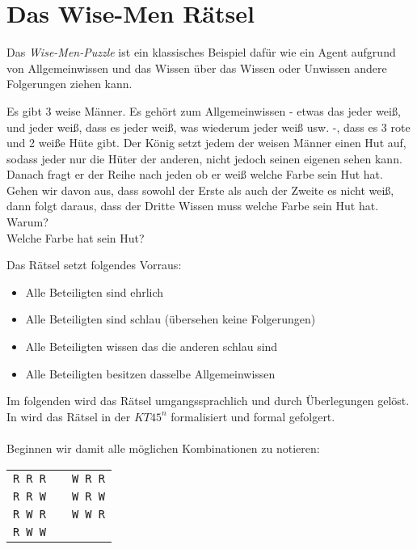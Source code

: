 

\section{Das Wise-Men Rätsel} %
\label{sub:das_wise_men_raetsel}

Das \emph{Wise-Men-Puzzle} ist ein klassisches Beispiel dafür wie ein Agent aufgrund von Allgemeinwissen und das Wissen über das Wissen oder Unwissen andere Folgerungen ziehen kann.

\begin{puzzle}
	\label{puz:wiseMen}
	Es gibt 3 weise Männer.
	Es gehört zum Allgemeinwissen - etwas das jeder weiß, und jeder weiß, dass es jeder weiß, was wiederum jeder weiß usw. -, dass es 3 rote und 2 weiße Hüte gibt.
	Der König setzt jedem der weisen Männer einen Hut auf, sodass jeder nur die Hüter der anderen, nicht jedoch seinen eigenen sehen kann.
	Danach fragt er der Reihe nach jeden ob er weiß welche Farbe sein Hut hat.
	Gehen wir davon aus, dass sowohl der Erste als auch der Zweite es nicht weiß, dann folgt daraus, dass der Dritte Wissen muss welche Farbe sein Hut hat.
	\\
	Warum?\\
	Welche Farbe hat sein Hut?
\end{puzzle}
%
%
Das Rätsel setzt folgendes Vorraus:
\begin{itemize}
	\item Alle Beteiligten sind ehrlich
	\item Alle Beteiligten sind schlau (übersehen keine Folgerungen)
	\item Alle Beteiligten wissen das die anderen schlau sind
	\item Alle Beteiligten besitzen dasselbe Allgemeinwissen
\end{itemize}
%
%
Im folgenden wird das Rätsel umgangssprachlich und durch Überlegungen gelöst. In  wird das Rätsel in der \MML $KT45^n$ formalisiert und formal gefolgert.\\
\\
Beginnen wir damit alle möglichen Kombinationen zu notieren:\\
%
\begin{tabular}{ccc}
\texttt{R R R} &   & \texttt{W R R}\\
\texttt{R R W} &   & \texttt{W R W}\\
\texttt{R W R} &   & \texttt{W W R}\\
\texttt{R W W} &   &   \\
\end{tabular}
